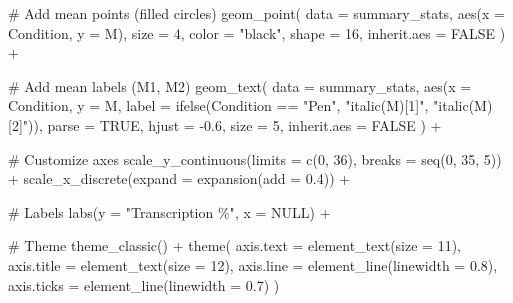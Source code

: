 \documentclass[
  letterpaper,
  DIV=11,
  numbers=noendperiod]{scrreprt}
\newenvironment{Shaded}{\begin{snugshade}}{\end{snugshade}}
\newcommand{\AttributeTok}[1]{\textcolor[rgb]{0.40,0.45,0.13}{#1}}
\newcommand{\CommentTok}[1]{\textcolor[rgb]{0.37,0.37,0.37}{#1}}
\newcommand{\ConstantTok}[1]{\textcolor[rgb]{0.56,0.35,0.01}{#1}}
\newcommand{\DecValTok}[1]{\textcolor[rgb]{0.68,0.00,0.00}{#1}}
\newcommand{\FloatTok}[1]{\textcolor[rgb]{0.68,0.00,0.00}{#1}}
\newcommand{\FunctionTok}[1]{\textcolor[rgb]{0.28,0.35,0.67}{#1}}
\newcommand{\NormalTok}[1]{\textcolor[rgb]{0.00,0.23,0.31}{#1}}
\newcommand{\SpecialCharTok}[1]{\textcolor[rgb]{0.37,0.37,0.37}{#1}}
\newcommand{\StringTok}[1]{\textcolor[rgb]{0.13,0.47,0.30}{#1}}
\begin{document}
\begin{Shaded}
\begin{Highlighting}[]
  \CommentTok{\# Add mean points (filled circles)}
  \FunctionTok{geom\_point}\NormalTok{(}
    \AttributeTok{data =}\NormalTok{ summary\_stats,}
    \FunctionTok{aes}\NormalTok{(}\AttributeTok{x =}\NormalTok{ Condition, }\AttributeTok{y =}\NormalTok{ M),}
    \AttributeTok{size =} \DecValTok{4}\NormalTok{, }
    \AttributeTok{color =} \StringTok{"black"}\NormalTok{, }
    \AttributeTok{shape =} \DecValTok{16}\NormalTok{,}
    \AttributeTok{inherit.aes =} \ConstantTok{FALSE}
\NormalTok{  ) }\SpecialCharTok{+}
  
  \CommentTok{\# Add mean labels (M1, M2)}
  \FunctionTok{geom\_text}\NormalTok{(}
    \AttributeTok{data =}\NormalTok{ summary\_stats,}
    \FunctionTok{aes}\NormalTok{(}\AttributeTok{x =}\NormalTok{ Condition, }\AttributeTok{y =}\NormalTok{ M, }
        \AttributeTok{label =} \FunctionTok{ifelse}\NormalTok{(Condition }\SpecialCharTok{==} \StringTok{"Pen"}\NormalTok{, }\StringTok{"italic(M)[1]"}\NormalTok{, }\StringTok{"italic(M)[2]"}\NormalTok{)),}
    \AttributeTok{parse =} \ConstantTok{TRUE}\NormalTok{, }
    \AttributeTok{hjust =} \SpecialCharTok{{-}}\FloatTok{0.6}\NormalTok{, }
    \AttributeTok{size =} \DecValTok{5}\NormalTok{,}
    \AttributeTok{inherit.aes =} \ConstantTok{FALSE}
\NormalTok{  ) }\SpecialCharTok{+}
  
  \CommentTok{\# Customize axes}
  \FunctionTok{scale\_y\_continuous}\NormalTok{(}\AttributeTok{limits =} \FunctionTok{c}\NormalTok{(}\DecValTok{0}\NormalTok{, }\DecValTok{36}\NormalTok{), }\AttributeTok{breaks =} \FunctionTok{seq}\NormalTok{(}\DecValTok{0}\NormalTok{, }\DecValTok{35}\NormalTok{, }\DecValTok{5}\NormalTok{)) }\SpecialCharTok{+}
  \FunctionTok{scale\_x\_discrete}\NormalTok{(}\AttributeTok{expand =} \FunctionTok{expansion}\NormalTok{(}\AttributeTok{add =} \FloatTok{0.4}\NormalTok{)) }\SpecialCharTok{+}
  
  \CommentTok{\# Labels}
  \FunctionTok{labs}\NormalTok{(}\AttributeTok{y =} \StringTok{"Transcription \%"}\NormalTok{, }\AttributeTok{x =} \ConstantTok{NULL}\NormalTok{) }\SpecialCharTok{+}
  
  \CommentTok{\# Theme}
  \FunctionTok{theme\_classic}\NormalTok{() }\SpecialCharTok{+}
  \FunctionTok{theme}\NormalTok{(}
    \AttributeTok{axis.text =} \FunctionTok{element\_text}\NormalTok{(}\AttributeTok{size =} \DecValTok{11}\NormalTok{),}
    \AttributeTok{axis.title =} \FunctionTok{element\_text}\NormalTok{(}\AttributeTok{size =} \DecValTok{12}\NormalTok{),}
    \AttributeTok{axis.line =} \FunctionTok{element\_line}\NormalTok{(}\AttributeTok{linewidth =} \FloatTok{0.8}\NormalTok{),}
    \AttributeTok{axis.ticks =} \FunctionTok{element\_line}\NormalTok{(}\AttributeTok{linewidth =} \FloatTok{0.7}\NormalTok{)}
\NormalTok{  )}
\end{Highlighting}
\end{Shaded}
\end{document}
